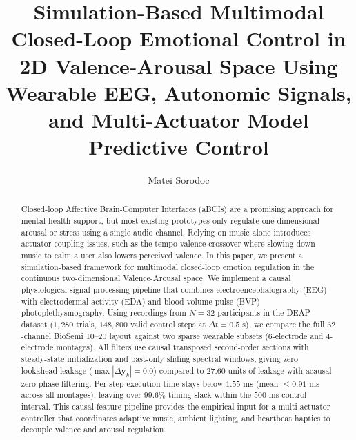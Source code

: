 \documentclass[a4paper,fleqn]{cas-dc}
\begin{document}
\let\WriteBookmarks\relax
\def\floatpagepagefraction{1}
\def\textpagefraction{.001}


\title [mode = title]{Simulation-Based Multimodal Closed-Loop Emotional Control in 2D Valence-Arousal Space Using Wearable EEG, Autonomic Signals, and Multi-Actuator Model Predictive Control}

\author[1]{Matei Sorodoc}
\cormark[1]



\begin{abstract}
Closed-loop Affective Brain-Computer Interfaces (aBCIs) are a promising approach for mental health support, but most existing prototypes only regulate one-dimensional arousal or stress using a single audio channel. Relying on music alone introduces actuator coupling issues, such as the tempo-valence crossover where slowing down music to calm a user also lowers perceived valence. In this paper, we present a simulation-based framework for multimodal closed-loop emotion regulation in the continuous two-dimensional Valence-Arousal space. We implement a causal physiological signal processing pipeline that combines electroencephalography (EEG) with electrodermal activity (EDA) and blood volume pulse (BVP) photoplethysmography. Using recordings from $N = 32$ participants in the DEAP dataset ($1,280$ trials, $148,800$ valid control steps at $\Delta t = 0.5\text{ s}$), we compare the full $32$-channel BioSemi 10--20 layout against two sparse wearable subsets ($6$-electrode and $4$-electrode montages). All filters use causal transposed second-order sections with steady-state initialization and past-only sliding spectral windows, giving zero lookahead leakage ($\max|\Delta \mathbf{y}_k| = 0.0$) compared to $27.60$ units of leakage with acausal zero-phase filtering. Per-step execution time stays below $1.55\text{ ms}$ (mean $\le 0.91\text{ ms}$ across all montages), leaving over $99.6\%$ timing slack within the $500\text{ ms}$ control interval. This causal feature pipeline provides the empirical input for a multi-actuator controller that coordinates adaptive music, ambient lighting, and heartbeat haptics to decouple valence and arousal regulation.
\end{abstract}
\end{document}
